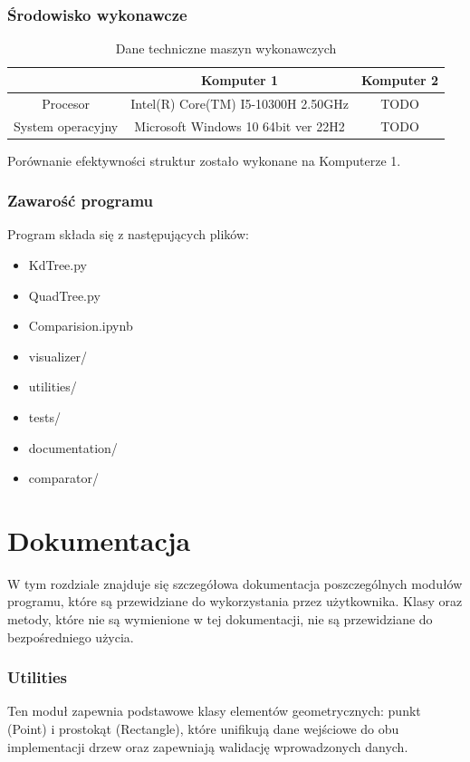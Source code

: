 \documentclass{lab}
\begin{document}
\section{Środowisko wykonawcze}
\begin{table}[h]
\centering
\begin{tabular}{|c|c|c|}
\hline
 & Komputer 1 & Komputer 2 \\
\hline
Procesor & Intel(R) Core(TM) I5-10300H 2.50GHz & TODO \\
\hline
System operacyjny & Microsoft Windows 10 64bit ver 22H2 & TODO \\
\hline
\end{tabular}
\caption{Dane techniczne maszyn wykonawczych}
\end{table}
Porównanie efektywności struktur zostało wykonane na Komputerze 1.
\section{Zawarość programu}
Program składa się z następujących plików:
\begin{itemize}
    \item KdTree.py
    \item QuadTree.py
    \item Comparision.ipynb
    \item visualizer/
    \item utilities/
    \item tests/
    \item documentation/
    \item comparator/
\end{itemize}

\part{Dokumentacja}
W tym rozdziale znajduje się szczegółowa dokumentacja poszczególnych modułów programu, które są przewidziane do wykorzystania przez użytkownika. Klasy oraz metody, które nie są wymienione w tej dokumentacji, nie są przewidziane do bezpośredniego użycia.
\section{Utilities}
Ten moduł zapewnia podstawowe klasy elementów geometrycznych: punkt (Point) i prostokąt (Rectangle), które unifikują dane wejściowe do obu implementacji drzew oraz zapewniają walidację wprowadzonych danych.
\end{document}
